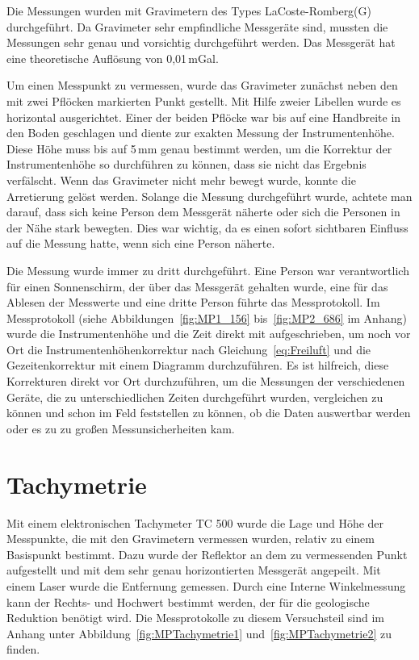 Die Messungen wurden mit Gravimetern des Types LaCoste-Romberg(G) durchgeführt. Da Gravimeter sehr empfindliche Messgeräte sind, mussten die Messungen sehr genau und vorsichtig durchgeführt werden. Das Messgerät hat eine 
theoretische Auflösung von 0,01\,mGal.

Um einen Messpunkt zu vermessen, wurde das Gravimeter zunächst neben den mit zwei Pflöcken markierten Punkt gestellt. Mit Hilfe zweier Libellen wurde es horizontal ausgerichtet. Einer der beiden Pflöcke 
war bis auf eine Handbreite in den Boden geschlagen und diente zur exakten Messung der Instrumentenhöhe. Diese Höhe muss bis auf 5\,mm genau bestimmt werden, um die Korrektur der Instrumentenhöhe so durchführen zu können, dass sie nicht das Ergebnis verfälscht.
Wenn das Gravimeter nicht mehr bewegt wurde, konnte die Arretierung gelöst werden. Solange die Messung durchgeführt wurde, achtete man darauf, dass sich keine Person dem Messgerät näherte oder sich die Personen in der Nähe stark bewegten. Dies war wichtig, da es einen sofort sichtbaren Einfluss auf die Messung hatte, wenn sich eine Person näherte.

Die Messung wurde immer zu dritt durchgeführt. Eine Person war verantwortlich für einen Sonnenschirm, der über das Messgerät gehalten wurde, eine für das Ablesen der Messwerte 
und eine dritte Person führte das Messprotokoll. Im Messprotokoll (siehe Abbildungen~\ref{fig:MP1_156} bis~\ref{fig:MP2_686} im Anhang) wurde die Instrumentenhöhe und die Zeit direkt mit aufgeschrieben, um noch vor Ort die Instrumentenhöhenkorrektur nach Gleichung~\eqref{eq:Freiluft} und die Gezeitenkorrektur mit einem Diagramm durchzuführen.
Es ist hilfreich, diese Korrekturen direkt vor Ort durchzuführen, um die Messungen der verschiedenen Geräte, die zu unterschiedlichen Zeiten durchgeführt wurden, vergleichen zu können und schon im Feld feststellen zu können, ob die Daten auswertbar werden oder es zu zu großen Messunsicherheiten kam.

\section{Tachymetrie}

Mit einem elektronischen Tachymeter TC 500 wurde die Lage und Höhe der Messpunkte, die mit den Gravimetern vermessen wurden, relativ zu einem Basispunkt bestimmt. Dazu wurde der Reflektor an dem zu vermessenden Punkt aufgestellt und mit dem sehr genau horizontierten Messgerät angepeilt. Mit einem Laser wurde die Entfernung gemessen. Durch eine Interne Winkelmessung kann der Rechts- und Hochwert bestimmt werden, der für die geologische Reduktion benötigt wird. Die Messprotokolle zu diesem Versuchsteil sind im Anhang unter Abbildung~\ref{fig:MPTachymetrie1} und~\ref{fig:MPTachymetrie2} zu finden.

